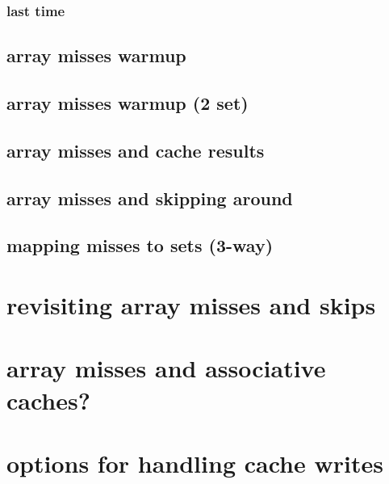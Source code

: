 \date{}
\title{}
\date{}

\begin{frame}
    \titlepage
\end{frame}

\begin{frame}
\frametitle{last time}
\end{frame}

\usetikzlibrary{calc,positioning}





\subsection{array misses warmup}


\subsection{array misses warmup (2 set)}


\subsection{array misses and cache results}


\subsection{array misses and skipping around}


\subsection{mapping misses to sets (3-way)}


\section{revisiting array misses and skips}

\section{array misses and associative caches?}


\section{options for handling cache writes}


